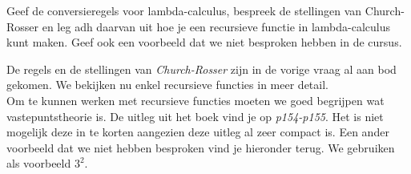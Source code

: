 \begin{quest}[Recursie]
	Geef de conversieregels voor lambda-calculus, bespreek de stellingen van Church-Rosser en leg adh daarvan uit hoe je een recursieve functie in lambda-calculus kunt maken. Geef ook een voorbeeld dat we niet besproken hebben in de cursus.
\end{quest}

De regels en de stellingen van \emph{Church-Rosser} zijn in de vorige vraag al aan bod gekomen. We bekijken nu enkel recursieve functies in meer detail.\\

Om te kunnen werken met recursieve functies moeten we goed begrijpen wat vastepuntstheorie is. De uitleg uit het boek vind je op \emph{p154-p155}. Het is niet mogelijk deze in te korten aangezien deze uitleg al zeer compact is. Een ander voorbeeld dat we niet hebben besproken vind je hieronder terug. We gebruiken als voorbeeld $3^2$.

